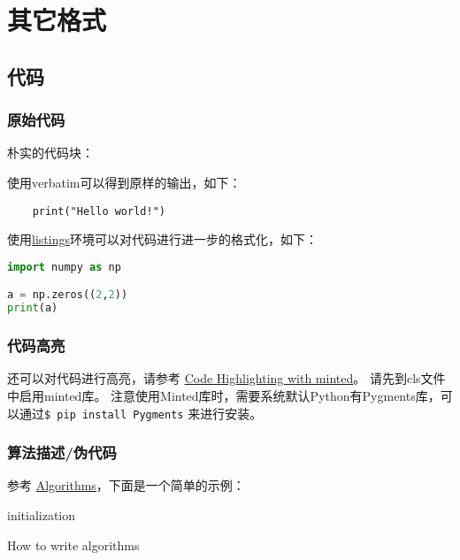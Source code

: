 
\chapter{其它格式}
\section{代码}
\subsection{原始代码}
朴实的代码块：

使用verbatim可以得到原样的输出，如下：

\begin{verbatim}
    print("Hello world!")
\end{verbatim}

使用\href{https://en.wikibooks.org/wiki/LaTeX/Source_Code_Listings}{listings}环境可以对代码进行进一步的格式化，如下：

\lstset{basicstyle=\ttfamily,breaklines=true}
\begin{lstlisting}[language=Python,frame=single]
import numpy as np

a = np.zeros((2,2))
print(a)
\end{lstlisting}

\subsection{代码高亮}
还可以对代码进行高亮，请参考 \href{https://www.overleaf.com/learn/latex/Code_Highlighting_with_minted}{Code Highlighting with minted}。
请先到cls文件中启用minted库。
注意使用Minted库时，需要系统默认Python有Pygments库，可以通过\verb|$ pip install Pygments| 来进行安装。



\subsection{算法描述/伪代码}
参考 \href{https://en.wikibooks.org/wiki/LaTeX/Algorithms}{Algorithms}，下面是一个简单的示例：

\begin{algorithm}[H]
  \SetAlgoLined
   initialization\;
  \caption{How to write algorithms}
\end{algorithm}

